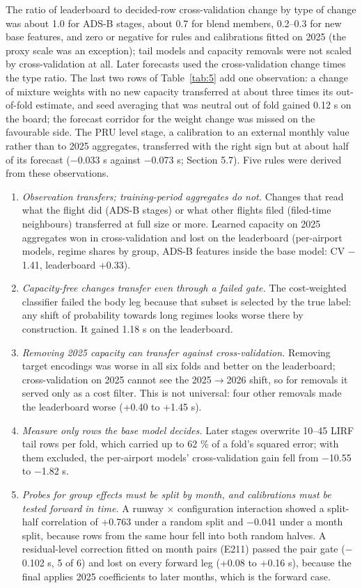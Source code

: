 \documentclass[11pt,a4paper]{article}
\providecommand{\tightlist}{\setlength{\itemsep}{0pt}\setlength{\parskip}{0pt}}
\begin{document}
The ratio of leaderboard to decided-row cross-validation change by type of change was about 1.0 for ADS-B stages, about 0.7 for blend members, 0.2--0.3 for new base features, and zero or negative for rules and calibrations fitted on 2025 (the proxy scale was an exception); tail models and capacity removals were not scaled by cross-validation at all. Later forecasts used the cross-validation change times the type ratio. The last two rows of Table~\ref{tab:5} add one observation: a change of mixture weights with no new capacity transferred at about three times its out-of-fold estimate, and seed averaging that was neutral out of fold gained 0.12 s on the board; the forecast corridor for the weight change was missed on the favourable side. The PRU level stage, a calibration to an external monthly value rather than to 2025 aggregates, transferred with the right sign but at about half of its forecast ($-$0.033 s against $-$0.073 s; Section 5.7). Five rules were derived from these observations.

\begin{enumerate}
\def\labelenumi{\arabic{enumi}.}
\tightlist
\item
  \emph{Observation transfers; training-period aggregates do not.} Changes that read what the flight did (ADS-B stages) or what other flights filed (filed-time neighbours) transferred at full size or more. Learned capacity on 2025 aggregates won in cross-validation and lost on the leaderboard (per-airport models, regime shares by group, ADS-B features inside the base model: CV $-$1.41, leaderboard +0.33).
\item
  \emph{Capacity-free changes transfer even through a failed gate.} The cost-weighted classifier failed the body leg because that subset is selected by the true label: any shift of probability towards long regimes looks worse there by construction. It gained 1.18 s on the leaderboard.
\item
  \emph{Removing 2025 capacity can transfer against cross-validation.} Removing target encodings was worse in all six folds and better on the leaderboard; cross-validation on 2025 cannot see the 2025$\rightarrow$2026 shift, so for removals it served only as a cost filter. This is not universal: four other removals made the leaderboard worse (+0.40 to +1.45 s).
\item
  \emph{Measure only rows the base model decides.} Later stages overwrite 10--45 LIRF tail rows per fold, which carried up to 62 \% of a fold's squared error; with them excluded, the per-airport models' cross-validation gain fell from $-$10.55 to $-$1.82 s.
\item
  \emph{Probes for group effects must be split by month, and calibrations must be tested forward in time.} A runway $\times$ configuration interaction showed a split-half correlation of +0.763 under a random split and $-$0.041 under a month split, because rows from the same hour fell into both random halves. A residual-level correction fitted on month pairs (E211) passed the pair gate ($-$0.102 s, 5 of 6) and lost on every forward leg (+0.08 to +0.16 s), because the final applies 2025 coefficients to later months, which is the forward case.
\end{enumerate}
\end{document}
